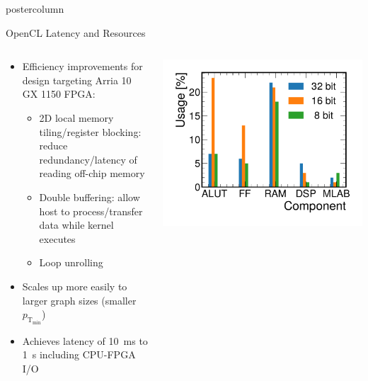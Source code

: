 \documentclass[final,hyperref={pdfpagelabels=false}]{beamer}
\newlength{\columnheight}
\newcommand{\ptmin}{\ensuremath{p_{\mathrm{T_{min}}}}\xspace}
\begin{document}
\begin{frame}
\begin{columns}
    \begin{column}{.33\textwidth}
      \begin{beamercolorbox}[center,wd=\textwidth]{postercolumn}
        \begin{minipage}[T]{.95\textwidth} 
          \parbox[t][\columnheight]{\textwidth}{
            
            \begin{block}{OpenCL Latency and Resources}
            \begin{columns}
             \begin{column}{.49\textwidth}
              \begin{itemize}
                \item Efficiency improvements for design targeting Arria 10 GX 1150 FPGA:
                \begin{itemize}
                    \item 2D local memory tiling/register blocking: reduce redundancy/latency of reading off-chip memory
                    \item Double buffering: allow host to process/transfer data while kernel executes
                    \item Loop unrolling
                \end{itemize}
                \item Scales up more easily to larger graph sizes (smaller \ptmin)
                \item Achieves latency of 10~ms to 1~s including CPU-FPGA I/O  
              \end{itemize}
              \end{column}
             \begin{column}{.49\textwidth}
                \begin{center}         \includegraphics[width=\linewidth]{figures/resource_bit_precision_ocl.pdf}

\end{center}
\end{column}
\end{columns}
\end{block}}
\end{minipage}
\end{beamercolorbox}
\end{column}
\end{columns}
\end{frame}
\end{document}

